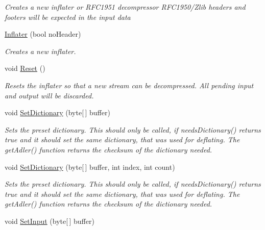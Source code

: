 \begin{DoxyCompactItemize}
\begin{DoxyCompactList}\small\item\em Creates a new inflater or R\+F\+C1951 decompressor R\+F\+C1950/\+Zlib headers and footers will be expected in the input data \end{DoxyCompactList}\item 
\hyperlink{class_i_c_sharp_code_1_1_sharp_zip_lib_1_1_zip_1_1_compression_1_1_inflater_a89e97fe8e5522be57c2de110655fbefb}{Inflater} (bool no\+Header)
\begin{DoxyCompactList}\small\item\em Creates a new inflater. \end{DoxyCompactList}\item 
void \hyperlink{class_i_c_sharp_code_1_1_sharp_zip_lib_1_1_zip_1_1_compression_1_1_inflater_acbaa9910d61e471a2832390c29734370}{Reset} ()
\begin{DoxyCompactList}\small\item\em Resets the inflater so that a new stream can be decompressed. All pending input and output will be discarded. \end{DoxyCompactList}\item 
void \hyperlink{class_i_c_sharp_code_1_1_sharp_zip_lib_1_1_zip_1_1_compression_1_1_inflater_a77ae6cd5e3d6cb82e366b0ffb453f4b1}{Set\+Dictionary} (byte\mbox{[}$\,$\mbox{]} buffer)
\begin{DoxyCompactList}\small\item\em Sets the preset dictionary. This should only be called, if needs\+Dictionary() returns true and it should set the same dictionary, that was used for deflating. The get\+Adler() function returns the checksum of the dictionary needed. \end{DoxyCompactList}\item 
void \hyperlink{class_i_c_sharp_code_1_1_sharp_zip_lib_1_1_zip_1_1_compression_1_1_inflater_a4fbf4573284725673347f385d0471fa4}{Set\+Dictionary} (byte\mbox{[}$\,$\mbox{]} buffer, int index, int count)
\begin{DoxyCompactList}\small\item\em Sets the preset dictionary. This should only be called, if needs\+Dictionary() returns true and it should set the same dictionary, that was used for deflating. The get\+Adler() function returns the checksum of the dictionary needed. \end{DoxyCompactList}\item 
void \hyperlink{class_i_c_sharp_code_1_1_sharp_zip_lib_1_1_zip_1_1_compression_1_1_inflater_ab70e1ce75cf7f35e53d6ad810a0bcec2}{Set\+Input} (byte\mbox{[}$\,$\mbox{]} buffer)

\end{DoxyCompactItemize}
